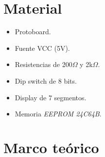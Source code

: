 \documentclass[12pt, oneside, openany]{article}
\begin{document}
\section{Material}
{\sffamily\large
    \renewcommand{\labelitemi}{$\bullet$}
    \begin{itemize}
        \item Protoboard.
        \item Fuente VCC (5V).
        \item Resistencias de 200$\Omega$ y 2k$\Omega$.
        \item Dip switch de 8 bits.
        \item Display de 7 segmentos.
        \item Memoria \emph{EEPROM 24C64B}.
    \end{itemize}
    
}

\newpage
\section{Marco teórico}
\end{document}
